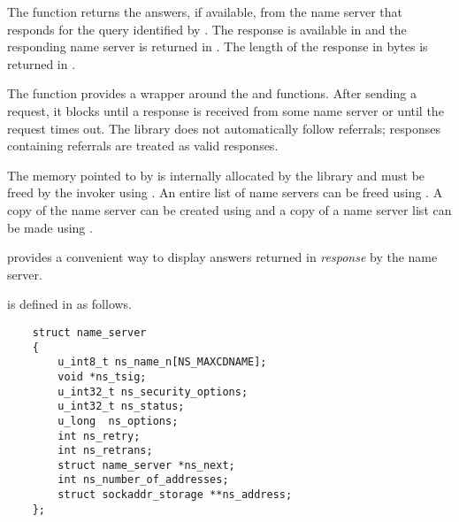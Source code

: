 The  function returns the answers, if available, from
the name server that responds for the query identified by .  The
response is available in  and the responding name server is
returned in .  The length of the response in bytes is returned
in .

The  function provides a wrapper around the 
and  functions.  After sending a request, it blocks
until a response is received from some name server or until the request times
out.  The  library does not automatically follow referrals;
responses containing referrals are treated as valid responses.

The memory pointed to by  is internally allocated by the
 library and must be freed by the invoker using
.  An entire list of name servers can be freed
using .  A copy of the name server can be created
using  and a copy of a name server list can be made using
.

 provides a convenient way to display answers returned
in {\it response} by the name server.

 is defined in  as follows.

\begin{verbatim}
    struct name_server
    {
        u_int8_t ns_name_n[NS_MAXCDNAME];
        void *ns_tsig;
        u_int32_t ns_security_options;
        u_int32_t ns_status;
        u_long  ns_options;
        int ns_retry;
        int ns_retrans;
        struct name_server *ns_next;
        int ns_number_of_addresses;
        struct sockaddr_storage **ns_address;
    };
\end{verbatim}


